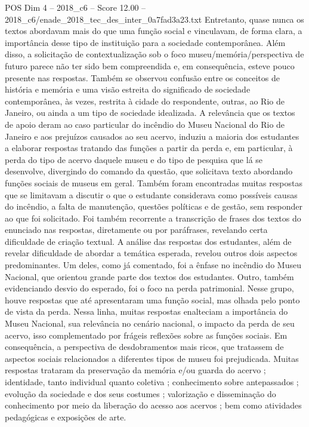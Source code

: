 \begin{textsample}{POS Dim 4 – 2018\_c6 – Score 12.00 – 2018\_c6/enade\_2018\_tec\_des\_inter\_0a7fad3a23.txt}
Entretanto, quase nunca os textos abordavam mais do que uma função social e vinculavam, de forma clara, a importância desse tipo de instituição para a sociedade contemporânea.
Além disso, a solicitação de contextualização sob o foco museu/memória/perspectiva de futuro parece não ter sido bem compreendida e, em consequência, esteve pouco presente nas respostas.
Também se observou confusão entre os conceitos de história e memória e uma visão estreita do significado de sociedade contemporânea, às vezes, restrita à cidade do respondente, outras, ao Rio de Janeiro, ou ainda a um tipo de sociedade idealizada.
A relevância que os textos de apoio deram ao caso particular do incêndio do Museu Nacional do Rio de Janeiro e aos prejuízos causados ao seu acervo, induziu a maioria dos estudantes a elaborar respostas tratando das funções a partir da perda e, em particular, à perda do tipo de acervo daquele museu e do tipo de pesquisa que lá se desenvolve, divergindo do comando da questão, que solicitava texto abordando funções sociais de museus em geral.
Também foram encontradas muitas respostas que se limitavam a discutir o que o estudante considerava como possíveis causas do incêndio, a falta de manutenção, questões políticas e de gestão, sem responder ao que foi solicitado.
Foi também recorrente a transcrição de frases dos textos do enunciado nas respostas, diretamente ou por paráfrases, revelando certa dificuldade de criação textual.
A análise das respostas dos estudantes, além de revelar dificuldade de abordar a temática esperada, revelou outros dois aspectos predominantes.
Um deles, como já comentado, foi a ênfase no incêndio do Museu Nacional, que orientou grande parte dos textos dos estudantes.
Outro, também evidenciando desvio do esperado, foi o foco na perda patrimonial.
Nesse grupo, houve respostas que até apresentaram uma função social, mas olhada pelo ponto de vista da perda.
Nessa linha, muitas respostas enalteciam a importância do Museu Nacional, sua relevância no cenário nacional, o impacto da perda de seu acervo, isso complementado por frágeis reflexões sobre as funções sociais.
Em consequência, a perspectiva de desdobramentos mais ricos, que tratassem de aspectos sociais relacionados a diferentes tipos de museu foi prejudicada.
Muitas respostas trataram da preservação da memória e/ou guarda do acervo ; identidade, tanto individual quanto coletiva ; conhecimento sobre antepassados ; evolução da sociedade e dos seus costumes ; valorização e disseminação do conhecimento por meio da liberação do acesso aos acervos ; bem como atividades pedagógicas e exposições de arte.

\end{textsample}
